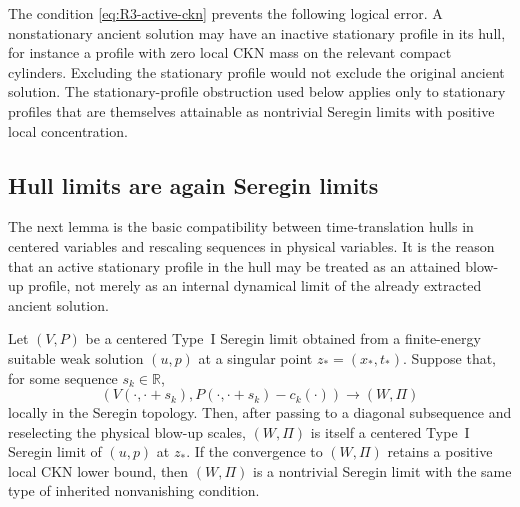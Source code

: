 \begin{remark}
\label{rem:R3-active-necessary}
The condition \eqref{eq:R3-active-ckn} prevents the following logical error.  A
nonstationary ancient solution may have an inactive stationary profile in its
hull, for instance a profile with zero local CKN mass on the relevant compact
cylinders.  Excluding the stationary profile would not exclude the original
ancient solution.  The stationary-profile obstruction used below applies only to stationary
profiles that are themselves attainable as nontrivial Seregin limits with
positive local concentration.
\end{remark}

\subsection{Hull limits are again Seregin limits}

The next lemma is the basic compatibility between time-translation hulls in
centered variables and rescaling sequences in physical variables.  It is the
reason that an active stationary profile in the hull may be treated as an
attained blow-up profile, not merely as an internal dynamical limit of the
already extracted ancient solution.

\begin{lemma}
\label{lem:R3-hull-is-seregin}
Let \((V,P)\) be a centered Type~I Seregin limit obtained from a finite-energy
suitable weak solution \((u,p)\) at a singular point \(z_*=(x_*,t_*)\).  Suppose
that, for some sequence \(s_k\in\mathbb R\),
\[
   (V(\cdot,\cdot+s_k),P(\cdot,\cdot+s_k)-c_k(\cdot))
   \to (W,\Pi)
\]
locally in the Seregin topology.  Then, after passing to a diagonal subsequence
and reselecting the physical blow-up scales, \((W,\Pi)\) is itself a centered
Type~I Seregin limit of \((u,p)\) at \(z_*\).  If the convergence to \((W,\Pi)\)
retains a positive local CKN lower bound, then \((W,\Pi)\) is a nontrivial
Seregin limit with the same type of inherited nonvanishing condition.
\end{lemma}

